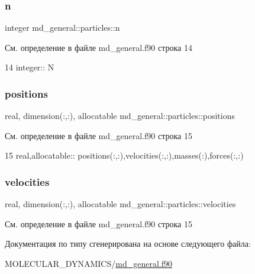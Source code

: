 \subsubsection{\texorpdfstring{n}{n}}
{\footnotesize\ttfamily integer md\+\_\+general\+::particles\+::n}



См. определение в файле md\+\_\+general.\+f90 строка 14


\begin{DoxyCode}
14     \textcolor{keywordtype}{integer}:: N
\end{DoxyCode}
\mbox{\label{structmd__general_1_1particles_a39f160de26e2d4fd6998e57f46fad846}} 
\subsubsection{\texorpdfstring{positions}{positions}}
{\footnotesize\ttfamily real, dimension(\+:,\+:), allocatable md\+\_\+general\+::particles\+::positions}



См. определение в файле md\+\_\+general.\+f90 строка 15


\begin{DoxyCode}
15     \textcolor{keywordtype}{real},\textcolor{keywordtype}{allocatable}::  positions(:,:),velocities(:,:),masses(:),forces(:,:)
\end{DoxyCode}
\mbox{\label{structmd__general_1_1particles_af4164f454743cd600f1f96b5f8bd57a7}} 
\subsubsection{\texorpdfstring{velocities}{velocities}}
{\footnotesize\ttfamily real, dimension(\+:,\+:), allocatable md\+\_\+general\+::particles\+::velocities}



См. определение в файле md\+\_\+general.\+f90 строка 15



Документация по типу сгенерирована на основе следующего файла\+:\begin{DoxyCompactItemize}
\item 
M\+O\+L\+E\+C\+U\+L\+A\+R\+\_\+\+D\+Y\+N\+A\+M\+I\+C\+S/\mbox{\hyperlink{md__general_8f90}{md\+\_\+general.\+f90}}\end{DoxyCompactItemize}

